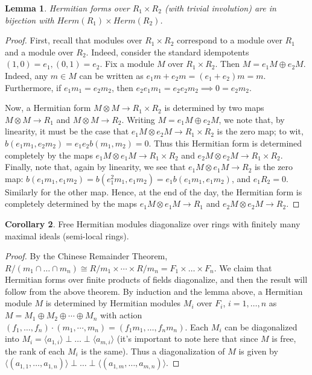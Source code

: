 \documentclass[edeposit,fullpage]{uiucthesis2009}
\theoremstyle{plain}
\newtheorem{lemma}{Lemma}
\numberwithin{lemma}{section}
\theoremstyle{definition}
\newtheorem{corollary}[lemma]{Corollary}
\begin{document}
\begin{lemma}
Hermitian forms over $R_1 \times R_2$ (with trivial involution) are in bijection with $Herm(R_1)
\times Herm(R_2)$.
\end{lemma}

\begin{proof}
First, recall that modules over $R_1 \times R_2$ correspond to a
module over $R_1$ and a module over $R_2$. Indeed, consider the
standard idempotents $(1,0) = e_1, (0,1) = e_2$. Fix a module $M$ over
$R_1 \times R_2$. Then $M = e_1M \oplus e_2M$. Indeed, any $m \in M$
can be written as $e_1m + e_2m = (e_1+e_2)m = m$. Furthermore, if
$e_1m_1 = e_2m_2$, then $e_2e_1m_1=e_2e_2m_2 \implies 0 = e_2m_2$. 

Now, a Hermitian form $M \otimes M \rightarrow R_1 \times R_2$ is
determined by two maps $M \otimes M \rightarrow R_1$ and $M \otimes M
\rightarrow R_2$. Writing $M = e_1M \oplus e_2M$, we note that, by
linearity, it must be the case that $e_1M \otimes e_2M \rightarrow R_1
\times R_2$ is the zero map; to wit, $b(e_1m_1,e_2m_2) =
e_1e_2b(m_1,m_2) = 0$. Thus this Hermitian form is determined
completely by the maps $e_1M \otimes e_1M \rightarrow R_1 \times R_2$
and $e_2M \otimes e_2M \rightarrow R_1 \times R_2$. Finally, note
that, again by linearity, we see that $e_1M \otimes e_1M \rightarrow
R_2$ is the zero map: $b(e_1m_1,e_1m_2) = b(e_1^2m_1,e_1m_2) =
e_1b(e_1m_1,e_1m_2)$, and $e_1R_2 = 0$. Similarly for the other
map. Hence, at the end of the day, the Hermitian form is completely
determined by the maps $e_1M \otimes e_1M \rightarrow R_1$ and $e_2M
\otimes e_2M \rightarrow R_2$. 
\end{proof}

\begin{corollary}
Free Hermitian modules diagonalize over rings with finitely many maximal
ideals (semi-local rings).
\end{corollary}

\begin{proof}
By the Chinese Remainder Theorem, $R/(m_1 \cap \dots \cap m_n) \cong
R/m_1 \times \cdots \times R/m_n = F_1 \times \dots \times F_n$. We
claim that Hermitian forms over finite products of fields
diagonalize, and then the result will follow from the above theorem. By induction and the lemma above, a Hermitian module $M$
is determined by Hermitian modules $M_i$ over $F_i$, $i =
1,\dots,n$ as $M = M_1 \oplus M_2 \oplus \cdots \oplus M_n$ with
action $(f_1,\dots,f_n) \cdot (m_1,\cdots,m_n) =
(f_1m_1,\dots,f_nm_n)$. Each $M_i$ can be diagonalized into $M_i = \langle a_{1,i}
\rangle \perp \dots \perp \langle a_{m,i}\rangle$ (it's important to
note here that since $M$ is free, the rank of each $M_i$ is the same). Thus a
diagonalization of $M$ is given by $\langle (a_{1,1},\dots,a_{1,n})
\rangle \perp \dots \perp \langle (a_{1,m},
\dots,a_{m,n})\rangle$. 
\end{proof}
\end{document}
